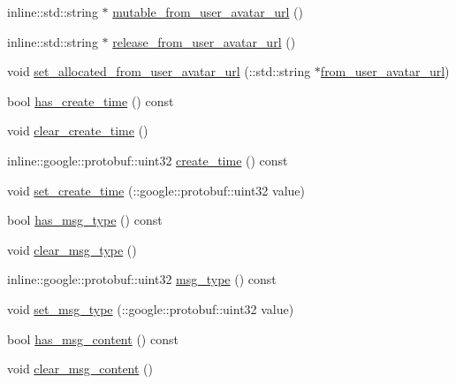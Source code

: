 \begin{DoxyCompactItemize}
\item 
inline\+::std\+::string $\ast$ \hyperlink{class_i_m_1_1_base_define_1_1_server_msg_info_a19455b1939a1501ac2b3e0dd778422a5}{mutable\+\_\+from\+\_\+user\+\_\+avatar\+\_\+url} ()
\item 
inline\+::std\+::string $\ast$ \hyperlink{class_i_m_1_1_base_define_1_1_server_msg_info_a2227e24351df80b4fb38bd1049e8b0ee}{release\+\_\+from\+\_\+user\+\_\+avatar\+\_\+url} ()
\item 
void \hyperlink{class_i_m_1_1_base_define_1_1_server_msg_info_adb7c7cf681f3910138eda99b17ebfd23}{set\+\_\+allocated\+\_\+from\+\_\+user\+\_\+avatar\+\_\+url} (\+::std\+::string $\ast$\hyperlink{class_i_m_1_1_base_define_1_1_server_msg_info_a15a09da50055edc710edfe9432d5f25f}{from\+\_\+user\+\_\+avatar\+\_\+url})
\item 
bool \hyperlink{class_i_m_1_1_base_define_1_1_server_msg_info_ad665c966c6791df54710b52b712d42e7}{has\+\_\+create\+\_\+time} () const 
\item 
void \hyperlink{class_i_m_1_1_base_define_1_1_server_msg_info_a7333901438892e82cef103e8db1220d9}{clear\+\_\+create\+\_\+time} ()
\item 
inline\+::google\+::protobuf\+::uint32 \hyperlink{class_i_m_1_1_base_define_1_1_server_msg_info_a6890cce6f9ed059d9a8debe30da787a2}{create\+\_\+time} () const 
\item 
void \hyperlink{class_i_m_1_1_base_define_1_1_server_msg_info_a9ff5d507a5df4d18d25a234a8b24d18b}{set\+\_\+create\+\_\+time} (\+::google\+::protobuf\+::uint32 value)
\item 
bool \hyperlink{class_i_m_1_1_base_define_1_1_server_msg_info_aff19ab36b0332f75d14ad04474ac6ea2}{has\+\_\+msg\+\_\+type} () const 
\item 
void \hyperlink{class_i_m_1_1_base_define_1_1_server_msg_info_add8b43c40eaf71d69ad29e0d6ff8d616}{clear\+\_\+msg\+\_\+type} ()
\item 
inline\+::google\+::protobuf\+::uint32 \hyperlink{class_i_m_1_1_base_define_1_1_server_msg_info_a455ecc2e7022861932c31999ea86eeca}{msg\+\_\+type} () const 
\item 
void \hyperlink{class_i_m_1_1_base_define_1_1_server_msg_info_a534fbab79c8e82556487b0e8070b5fb0}{set\+\_\+msg\+\_\+type} (\+::google\+::protobuf\+::uint32 value)
\item 
bool \hyperlink{class_i_m_1_1_base_define_1_1_server_msg_info_a080f3409a37ab52a1bf635f8fcb3843f}{has\+\_\+msg\+\_\+content} () const 
\item 
void \hyperlink{class_i_m_1_1_base_define_1_1_server_msg_info_ad7520d906c5dfccb50376c535b419dd1}{clear\+\_\+msg\+\_\+content} ()

\end{DoxyCompactItemize}
